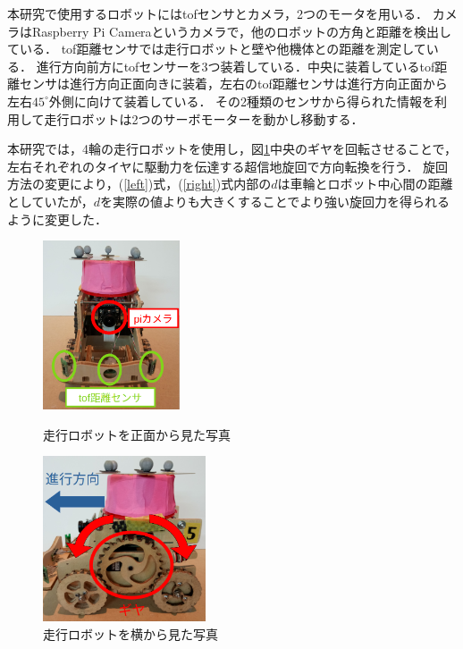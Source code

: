 \documentclass[twocolumn,dvipdfmx]{jarticle}
\begin{document}
本研究で使用するロボットにはtofセンサとカメラ，2つのモータを用いる．
カメラはRaspberry Pi Cameraというカメラで，他のロボットの方角と距離を検出している．
tof距離センサでは走行ロボットと壁や他機体との距離を測定している．
進行方向前方にtofセンサーを3つ装着している．中央に装着しているtof距離センサは進行方向正面向きに装着，左右のtof距離センサは進行方向正面から左右$45^{\circ}$外側に向けて装着している．
その2種類のセンサから得られた情報を利用して走行ロボットは2つのサーボモーターを動かし移動する．

本研究では，4輪の走行ロボットを使用し，図\ref{fig:ssr2}中央のギヤを回転させることで，左右それぞれのタイヤに駆動力を伝達する超信地旋回で方向転換を行う．
旋回方法の変更により，(\ref{left})式，(\ref{right})式内部の$d$は車輪とロボット中心間の距離としていたが，$d$を実際の値よりも大きくすることでより強い旋回力を得られるように変更した．
\begin{figure}[htb]
  \begin{minipage}[b]{0.42\linewidth}
    \centering
    \includegraphics[height=5cm,width=1.0\linewidth]{pic/ssrrobo1.png}
    \caption{走行ロボットを正面から見た写真}
    \label{fig:ssr1}
  \end{minipage}
  \hspace{5mm}
  \begin{minipage}[b]{0.42\linewidth}
    \centering
    \includegraphics[height=4.9cm,width=1.0\linewidth]{pic/ssrrobo2.png}
    \caption{走行ロボットを横から見た写真}
    \label{fig:ssr2}
  \end{minipage}
\end{figure}
\end{document}
